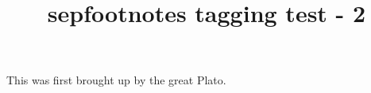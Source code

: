 \documentclass{article}
\title{sepfootnotes tagging test - 2}
\begin{document}
This was first brought up by the great Plato.
\end{document}

